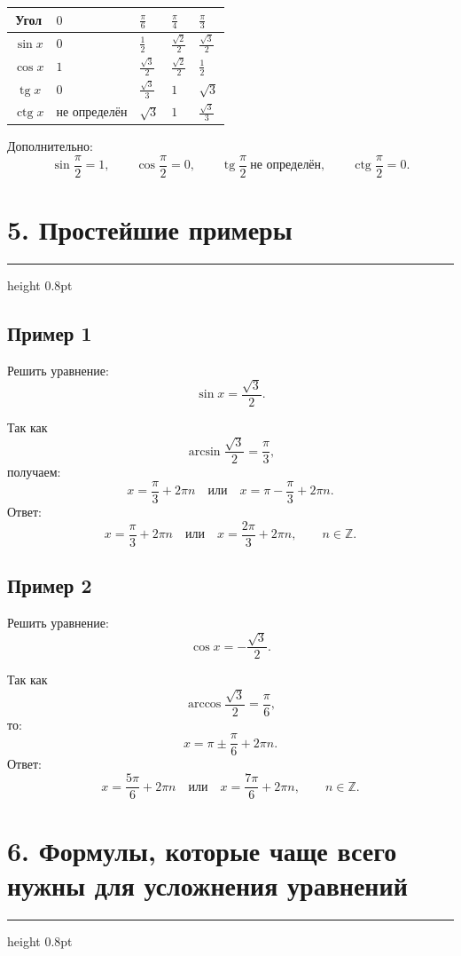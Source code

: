 \documentclass[a4paper,12pt]{article}
\newcommand{\sectionline}{\vspace{0.2em}\textcolor{accent}{\hrule height 0.8pt}\vspace{0.7em}}
\newcommand{\Z}{\mathbb{Z}}
\newcommand{\tg}{\mathop{\mathrm{tg}}\nolimits}
\newcommand{\ctg}{\mathop{\mathrm{ctg}}\nolimits}
\begin{document}
\begin{center}
\renewcommand{\arraystretch}{1.45}
\begin{tabularx}{\linewidth}{@{}cXXXX@{}}
\toprule
\textbf{Угол} & \(0\) & \(\frac{\pi}{6}\) & \(\frac{\pi}{4}\) & \(\frac{\pi}{3}\) \\
\midrule
\(\sin x\) & \(0\) & \(\frac12\) & \(\frac{\sqrt2}{2}\) & \(\frac{\sqrt3}{2}\) \\
\(\cos x\) & \(1\) & \(\frac{\sqrt3}{2}\) & \(\frac{\sqrt2}{2}\) & \(\frac12\) \\
\(\tg x\) & \(0\) & \(\frac{\sqrt3}{3}\) & \(1\) & \(\sqrt3\) \\
\(\ctg x\) & не определён & \(\sqrt3\) & \(1\) & \(\frac{\sqrt3}{3}\) \\
\bottomrule
\end{tabularx}
\end{center}

Дополнительно:
\[
\sin\frac{\pi}{2}=1,
\qquad
\cos\frac{\pi}{2}=0,
\qquad
\tg\frac{\pi}{2}\ \text{не определён},
\qquad
\ctg\frac{\pi}{2}=0.
\]

\section*{5. Простейшие примеры}
\sectionline

\subsection*{Пример 1}

Решить уравнение:
\[
\sin x=\frac{\sqrt3}{2}.
\]

Так как
\[
\arcsin\frac{\sqrt3}{2}=\frac{\pi}{3},
\]
получаем:
\[
x=\frac{\pi}{3}+2\pi n
\quad \text{или} \quad
x=\pi-\frac{\pi}{3}+2\pi n.
\]
Ответ:
\[
x=\frac{\pi}{3}+2\pi n
\quad \text{или} \quad
x=\frac{2\pi}{3}+2\pi n,
\qquad n\in\Z.
\]

\subsection*{Пример 2}

Решить уравнение:
\[
\cos x=-\frac{\sqrt3}{2}.
\]

Так как
\[
\arccos\frac{\sqrt3}{2}=\frac{\pi}{6},
\]
то:
\[
x=\pi\pm\frac{\pi}{6}+2\pi n.
\]
Ответ:
\[
x=\frac{5\pi}{6}+2\pi n
\quad \text{или} \quad
x=\frac{7\pi}{6}+2\pi n,
\qquad n\in\Z.
\]

\section*{6. Формулы, которые чаще всего нужны для усложнения уравнений}
\sectionline
\end{document}
